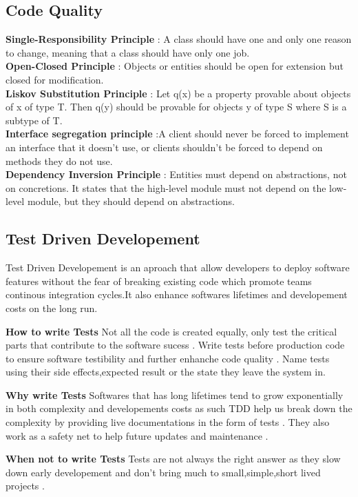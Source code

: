 \documentclass{article}
\begin{document}
\subsection{Code Quality}
\textbf{Single-Responsibility Principle} : A class should have one and only one reason to change, meaning that a class should have only one job.\\
\textbf{Open-Closed Principle} : Objects or entities should be open for extension but closed for modification.\\
\textbf{Liskov Substitution Principle} : Let q(x) be a property provable about objects of x of type T. Then q(y) should be provable for objects y of type S where S is a subtype of T.\\
\textbf{Interface segregation principle} :A client should never be forced to implement an interface that it doesn’t use, or clients shouldn’t be forced to depend on methods they do not use. \\
\textbf{Dependency Inversion Principle} : Entities must depend on abstractions, not on concretions. It states that the high-level module must not depend on the low-level module, but they should depend on abstractions.
\subsection{Test Driven Developement}
Test Driven Developement is an aproach that allow developers to deploy software features without the fear of breaking existing code which promote teams continous integration cycles.It also enhance softwares lifetimes and developement costs on the long run.

\textbf{How to write Tests}
Not all the code is created equally, only test the critical parts that contribute to the software sucess .
Write tests before production code to ensure software testibility and further enhanche code quality .
Name tests using their side effects,expected result or the state they leave the system in. 

\textbf{Why write Tests}
Softwares that has long lifetimes tend to grow exponentially in both complexity and developements costs as such TDD help us break down the complexity by providing live documentations in the form of tests .
They also work as a safety net to help future updates and maintenance .

\textbf{When not to write Tests}
Tests are not always the right answer as they slow down early developement and don't bring much to small,simple,short lived projects .
\end{document}
